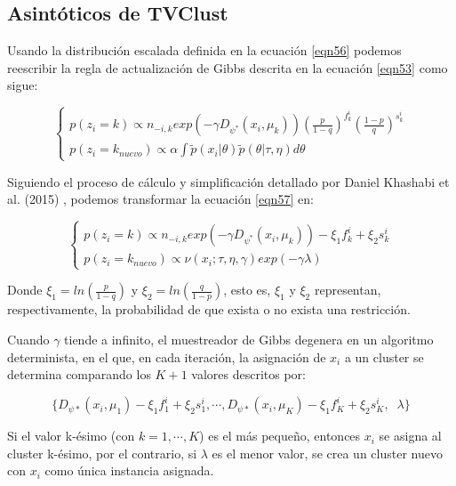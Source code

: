 \subsection{Asintóticos de TVClust}

Usando la distribución escalada definida en la ecuación \ref{eqn56} podemos reescribir la regla de actualización de Gibbs descrita en la ecuación \ref{eqn53} como sigue:

\begin{equation}
\begin{cases}
p(z_i = k) \varpropto n_{-i,k}exp(-\gamma D_{\psi^*}(x_i,\mu_k))\left(\frac{p}{1-q}\right)^{f_{k}^i} \left(\frac{1-p}{q}\right)^{s_{k}^i} \\
p(z_i = k_{nuevo}) \varpropto \alpha \int \widetilde{p}(x_i|\theta)\widetilde{p}(\theta|\tau, \eta)d\theta
\end{cases}
\label{eqn57}
\end{equation}

Siguiendo el proceso de cálculo y simplificación detallado por Daniel Khashabi et al. (2015) \cite{RDPM:2015}, podemos transformar la ecuación \ref{eqn57} en:

\begin{equation}
\begin{cases}
p(z_i = k) \varpropto n_{-i,k}exp(-\gamma D_{\psi^*}(x_i,\mu_k)) - \xi_1 f_{k}^i + \xi_2 s_{k}^i \\
p(z_i = k_{nuevo}) \varpropto \nu(x_i; \tau, \eta, \gamma) exp(-\gamma \lambda)
\end{cases}
\label{eqn58}
\end{equation}

Donde $\xi_1 = ln\left(\frac{p}{1-q}\right)$ y $\xi_2 = ln\left(\frac{q}{1-p}\right)$, esto es, $\xi_1$ y $\xi_2$ representan, respectivamente, la probabilidad de que exista o no exista una restricción.

Cuando $\gamma$ tiende a infinito, el muestreador de Gibbs degenera en un algoritmo determinista, en el que, en cada iteración, la asignación de $x_i$ a un cluster se determina comparando los $K+1$ valores descritos por:

\begin{equation}
\{D_{\psi*}(x_i, \mu_1) - \xi_1 f_{1}^i  + \xi_2 s_{1}^i, \cdots, D_{\psi*}(x_i, \mu_K) - \xi_1 f_{K}^i + \xi_2 s_{K}^i, \;\; \lambda \}
\label{eqn59}
\end{equation}

Si el valor k-ésimo (con $k = 1, \cdots, K$) es el más pequeño, entonces $x_i$ se asigna al cluster k-ésimo, por el contrario, si $\lambda$ es el menor valor, se crea un cluster nuevo con $x_i$ como única instancia asignada.

